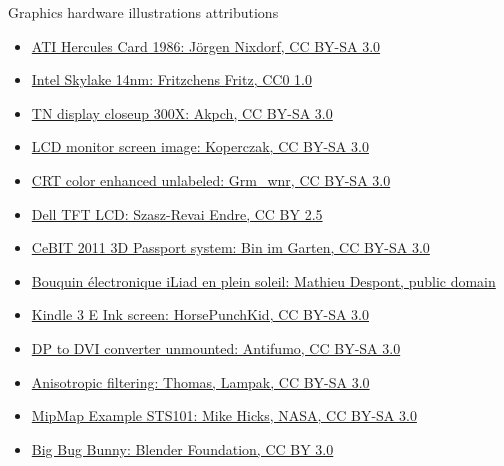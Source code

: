 \begin{frame}{Graphics hardware illustrations attributions}
  \small
  \begin{itemize}
  \item \href{https://commons.wikimedia.org/wiki/File:ATI_Hercules_Card_1986.xcf}{ATI Hercules Card 1986: Jörgen Nixdorf, CC BY-SA 3.0}
  \item \href{https://commons.wikimedia.org/wiki/File:Intel@14nm@@Skylake@Skylake-X(LCC)@i7-7820X@SR3L5_DSC00646_(25952474218).jpg}{Intel Skylake 14nm: Fritzchens Fritz, CC0 1.0}
  \item \href{https://commons.wikimedia.org/wiki/File:TN_display_closeup_300X.jpg}{TN display closeup 300X: Akpch, CC BY-SA 3.0}
  \item \href{https://commons.wikimedia.org/wiki/File:LCDmonitorscreenimage.jpg}{LCD monitor screen image: Koperczak, CC BY-SA 3.0}
  \item \href{https://commons.wikimedia.org/wiki/File:CRT_color_enhanced_unlabeled.png}{CRT color enhanced unlabeled: Grm\_wnr, CC BY-SA 3.0}
  \item \href{https://commons.wikimedia.org/wiki/File:Wiki_dell_lcd.jpg}{Dell TFT LCD: Szasz-Revai Endre, CC BY 2.5}
  \item \href{https://commons.wikimedia.org/wiki/File:CeBIT_2011_Samstag_PD_115.JPG}{CeBIT 2011 3D Passport system: Bin im Garten, CC BY-SA 3.0}
  \item \href{https://commons.wikimedia.org/wiki/File:Bouquin_\%C3\%A9lectronique_iLiad_en_plein_soleil.jpg}{Bouquin électronique iLiad en plein soleil: Mathieu Despont, public domain}
  \item \href{https://commons.wikimedia.org/wiki/File:Kindle_3_texture_(crop).jpg}{Kindle 3 E Ink screen: HorsePunchKid, CC BY-SA 3.0}
  \item \href{https://commons.wikimedia.org/wiki/File:DP_to_DVI_converter_unmounted.jpg}{DP to DVI converter unmounted: Antifumo, CC BY-SA 3.0}
  \item \href{https://commons.wikimedia.org/wiki/File:Anisotropic_filtering_en.png}{Anisotropic filtering: Thomas, Lampak, CC BY-SA 3.0}
  \item \href{https://commons.wikimedia.org/wiki/File:MipMap_Example_STS101.jpg}{MipMap Example STS101: Mike Hicks, NASA, CC BY-SA 3.0}
  \item \href{https://peach.blender.org/}{Big Bug Bunny: Blender Foundation, CC BY 3.0}
  \end{itemize}
\end{frame}
